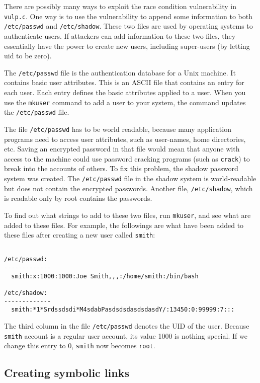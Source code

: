 There are possibly many ways to exploit the race condition vulnerability
in {\tt vulp.c}. One way is to use the vulnerability to append some 
information to both {\tt /etc/passwd} and {\tt /etc/shadow}. These two
files are used by \unix operating systems to authenticate users. If attackers
can add information to these two files, they essentially have the power
to create new users, including super-users (by letting uid to be zero).

The {\tt /etc/passwd} file is the authentication database for a Unix machine. 
It contains basic user attributes. 
This is an ASCII file that contains an entry for each
user. Each entry defines the basic attributes applied to a user. When you use
the {\tt mkuser} command to add a user to your system, the command updates the
{\tt /etc/passwd} file. 

The file {\tt /etc/passwd} has to be world readable, because many application
programs need to access user attributes, such as user-names, home directories, etc.
Saving an encrypted password in that file would mean that
anyone with access to the machine could use password cracking programs (such as
{\tt crack}) to break into the accounts of others. To fix this problem, the shadow
password system was created. The {\tt /etc/passwd} file in the shadow system is
world-readable but does not contain the encrypted passwords. Another file,
{\tt /etc/shadow}, which is readable only by root contains the passwords.

To find out what strings to add to these two files, run {\tt mkuser}, and see
what are added to these files. For example, the followings are what have 
been added to these files after creating a new user called {\tt smith}: 

\begin{verbatim}

/etc/passwd: 
-------------
  smith:x:1000:1000:Joe Smith,,,:/home/smith:/bin/bash

/etc/shadow: 
-------------
  smith:*1*Srdssdsdi*M4sdabPasdsdsdasdsdasdY/:13450:0:99999:7:::
\end{verbatim}

The third column in the file {\tt /etc/passwd} denotes the UID of the user. 
Because {\tt smith} account is a regular user account, its value 1000 is nothing 
special. If we change this entry to 0, {\tt smith} now becomes {\tt root}. 


\subsection{Creating symbolic links} 

